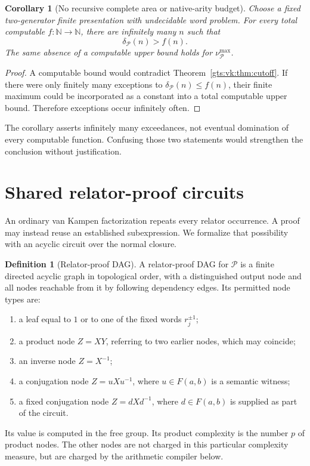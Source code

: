\documentclass[11pt,letterpaper]{article}
\newtheorem{corollary}[theorem]{Corollary}
\theoremstyle{definition}
\newtheorem{definition}[theorem]{Definition}
\theoremstyle{remark}
\newcommand{\N}{\mathbb N}
\newcommand{\Pp}{\mathcal P}
\newcommand{\F}{F(a,b)}
\begin{document}
\begin{corollary}[No recursive complete area or native-arity budget]\label{gts:vk:cor:nonrecursive}
Choose a fixed two-generator finite presentation with undecidable word problem. For every total computable $f:\N\to\N$, there are infinitely many $n$ such that
\[
 \delta_{\Pp}(n)>f(n).
\]
The same absence of a computable upper bound holds for $\nu_{\Pp}^{\max}$.
\end{corollary}

\begin{proof}
A computable bound would contradict Theorem~\ref{gts:vk:thm:cutoff}. If there were only finitely many exceptions to $\delta_{\Pp}(n)\leq f(n)$, their finite maximum could be incorporated as a constant into a total computable upper bound. Therefore exceptions occur infinitely often.
\end{proof}

The corollary asserts infinitely many exceedances, not eventual domination of every computable function. Confusing those two statements would strengthen the conclusion without justification.

\section{Shared relator-proof circuits}\label{gts:vk:sec:dag-semantics}

An ordinary van Kampen factorization repeats every relator occurrence. A proof may instead reuse an established subexpression. We formalize that possibility with an acyclic circuit over the normal closure.

\begin{definition}[Relator-proof DAG]\label{gts:vk:def:dag}
A relator-proof DAG for $\Pp$ is a finite directed acyclic graph in topological order, with a distinguished output node and all nodes reachable from it by following dependency edges. Its permitted node types are:
\begin{enumerate}[label=(\alph*)]
\item a leaf equal to $1$ or to one of the fixed words $r_j^{\pm1}$;
\item a product node $Z=XY$, referring to two earlier nodes, which may coincide;
\item an inverse node $Z=X^{-1}$;
\item a conjugation node $Z=uXu^{-1}$, where $u\in\F$ is a semantic witness;
\item a fixed conjugation node $Z=dXd^{-1}$, where $d\in\F$ is supplied as part of the circuit.
\end{enumerate}
Its value is computed in the free group. Its product complexity is the number $p$ of product nodes. The other nodes are not charged in this particular complexity measure, but are charged by the arithmetic compiler below.
\end{definition}
\end{document}
